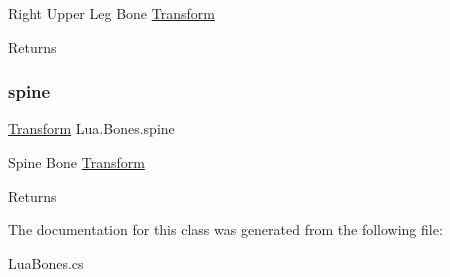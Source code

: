 Right Upper Leg Bone \mbox{\hyperlink{class_lua_1_1_transform}{Transform}} 

\begin{DoxyReturn}{Returns}

\end{DoxyReturn}
\mbox{\label{class_lua_1_1_bones_a28da7e69ef1c810bd255236404ad039a}} 
\subsubsection{\texorpdfstring{spine}{spine}}
{\footnotesize\ttfamily \mbox{\hyperlink{class_lua_1_1_transform}{Transform}} Lua.\+Bones.\+spine\hspace{0.3cm}{\ttfamily [get]}}



Spine Bone \mbox{\hyperlink{class_lua_1_1_transform}{Transform}} 

\begin{DoxyReturn}{Returns}

\end{DoxyReturn}


The documentation for this class was generated from the following file\+:\begin{DoxyCompactItemize}
\item 
Lua\+Bones.\+cs\end{DoxyCompactItemize}
